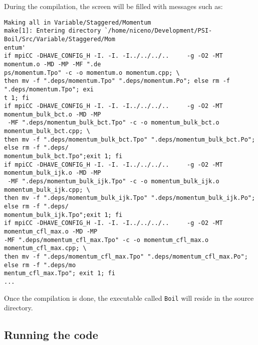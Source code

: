 During the compilation, the screen will be filled with messages such as:
%
{\small \begin{verbatim}
Making all in Variable/Staggered/Momentum
make[1]: Entering directory `/home/niceno/Development/PSI-Boil/Src/Variable/Staggered/Mom
entum'
if mpiCC -DHAVE_CONFIG_H -I. -I. -I../../../..     -g -O2 -MT momentum.o -MD -MP -MF ".de
ps/momentum.Tpo" -c -o momentum.o momentum.cpp; \
then mv -f ".deps/momentum.Tpo" ".deps/momentum.Po"; else rm -f ".deps/momentum.Tpo"; exi
t 1; fi
if mpiCC -DHAVE_CONFIG_H -I. -I. -I../../../..     -g -O2 -MT momentum_bulk_bct.o -MD -MP
 -MF ".deps/momentum_bulk_bct.Tpo" -c -o momentum_bulk_bct.o momentum_bulk_bct.cpp; \
then mv -f ".deps/momentum_bulk_bct.Tpo" ".deps/momentum_bulk_bct.Po"; else rm -f ".deps/
momentum_bulk_bct.Tpo";exit 1; fi
if mpiCC -DHAVE_CONFIG_H -I. -I. -I../../../..     -g -O2 -MT momentum_bulk_ijk.o -MD -MP
 -MF ".deps/momentum_bulk_ijk.Tpo" -c -o momentum_bulk_ijk.o momentum_bulk_ijk.cpp; \
then mv -f ".deps/momentum_bulk_ijk.Tpo" ".deps/momentum_bulk_ijk.Po"; else rm -f ".deps/
momentum_bulk_ijk.Tpo";exit 1; fi
if mpiCC -DHAVE_CONFIG_H -I. -I. -I../../../..     -g -O2 -MT momentum_cfl_max.o -MD -MP 
-MF ".deps/momentum_cfl_max.Tpo" -c -o momentum_cfl_max.o momentum_cfl_max.cpp; \
then mv -f ".deps/momentum_cfl_max.Tpo" ".deps/momentum_cfl_max.Po"; else rm -f ".deps/mo
mentum_cfl_max.Tpo"; exit 1; fi
...
\end{verbatim}}
%
Once the compilation is done, the executable called {\tt Boil} will reside in the
source directory. 

\subsection{Running the code}

